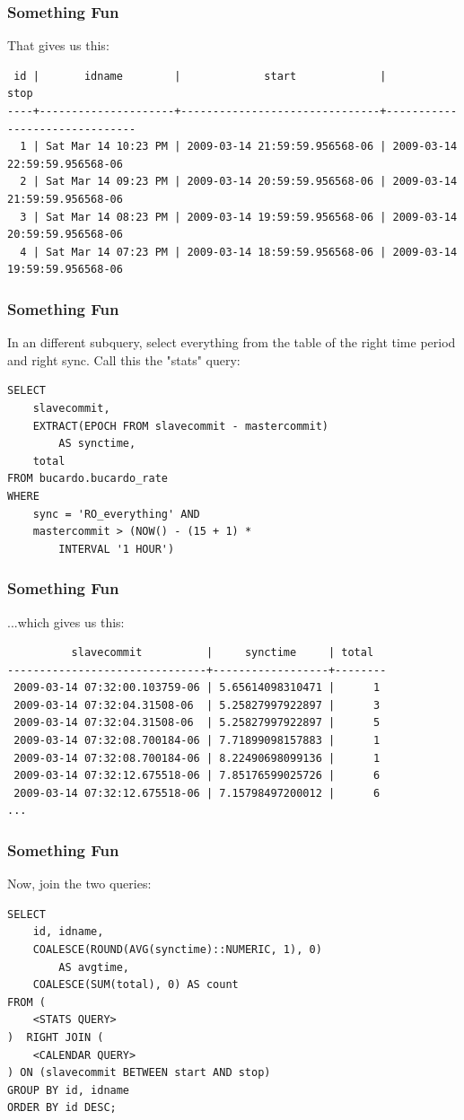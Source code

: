 \documentclass{beamer}
\begin{document}
\begin{frame}[fragile]
    \frametitle{Something Fun}
    That gives us this:
    \tiny
    \begin{verbatim}
 id |       idname        |             start             |             stop
----+---------------------+-------------------------------+-------------------------------
  1 | Sat Mar 14 10:23 PM | 2009-03-14 21:59:59.956568-06 | 2009-03-14 22:59:59.956568-06
  2 | Sat Mar 14 09:23 PM | 2009-03-14 20:59:59.956568-06 | 2009-03-14 21:59:59.956568-06
  3 | Sat Mar 14 08:23 PM | 2009-03-14 19:59:59.956568-06 | 2009-03-14 20:59:59.956568-06
  4 | Sat Mar 14 07:23 PM | 2009-03-14 18:59:59.956568-06 | 2009-03-14 19:59:59.956568-06
    \end{verbatim}
    \normalsize
\end{frame}

\begin{frame}[fragile]
    \frametitle{Something Fun}
    In an different subquery, select everything from the table of the right
    time period and right sync. Call this the "stats" query:
    \begin{verbatim}
SELECT
    slavecommit,
    EXTRACT(EPOCH FROM slavecommit - mastercommit)
        AS synctime,
    total
FROM bucardo.bucardo_rate
WHERE
    sync = 'RO_everything' AND
    mastercommit > (NOW() - (15 + 1) *
        INTERVAL '1 HOUR')
    \end{verbatim}
\end{frame}

\begin{frame}[fragile]
    \frametitle{Something Fun}
    ...which gives us this:
    \footnotesize
    \begin{verbatim}
          slavecommit          |     synctime     | total
-------------------------------+------------------+--------
 2009-03-14 07:32:00.103759-06 | 5.65614098310471 |      1
 2009-03-14 07:32:04.31508-06  | 5.25827997922897 |      3
 2009-03-14 07:32:04.31508-06  | 5.25827997922897 |      5
 2009-03-14 07:32:08.700184-06 | 7.71899098157883 |      1
 2009-03-14 07:32:08.700184-06 | 8.22490698099136 |      1
 2009-03-14 07:32:12.675518-06 | 7.85176599025726 |      6
 2009-03-14 07:32:12.675518-06 | 7.15798497200012 |      6
...
    \end{verbatim}
    \normalsize
\end{frame}

\begin{frame}[fragile]
    \frametitle{Something Fun}
    Now, join the two queries:
    \begin{verbatim}
SELECT
    id, idname,
    COALESCE(ROUND(AVG(synctime)::NUMERIC, 1), 0)
        AS avgtime,
    COALESCE(SUM(total), 0) AS count
FROM (
    <STATS QUERY>
)  RIGHT JOIN (
    <CALENDAR QUERY>
) ON (slavecommit BETWEEN start AND stop)
GROUP BY id, idname
ORDER BY id DESC;
    \end{verbatim}
\end{frame}
\end{document}
